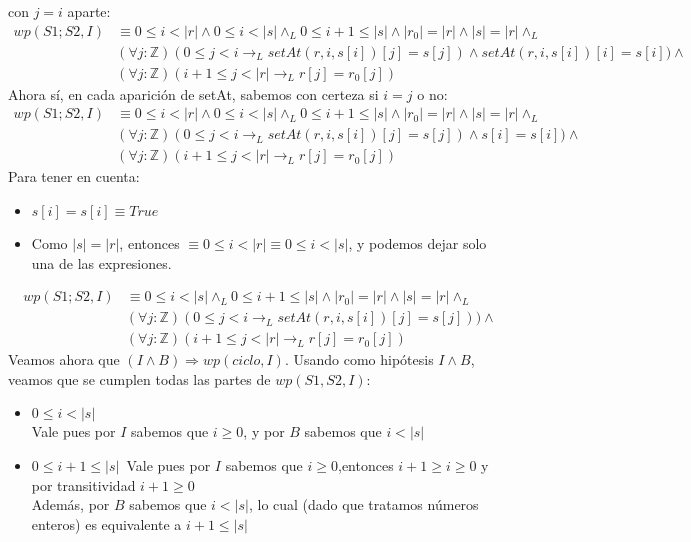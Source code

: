 \documentclass{article}
\begin{document}
\begin{enumerate}[label=\alph*)]
	con $j=i$ aparte:\\
	\begin{align*}
	wp(S1;S2,I)&\equiv   0\leq i<|r|\wedge 0\leq i<|s|\wedge_L 0\leq i+1\leq |s| \wedge |r_0|=|r|\wedge |s|=|r|\wedge_L \\
		&(\forall j:\mathbb{Z})(0\leq j<i \rightarrow_L setAt(r,i,s[i])[j]=s[j])\wedge setAt(r,i,s[i])[i]=s[i])\wedge\\
		&(\forall j:\mathbb{Z})(i+1\leq j<|r|\rightarrow_L r[j]=r_0[j])
	\end{align*}
	Ahora sí, en cada aparición de setAt, sabemos con certeza si $i=j$ o no:\\
	\begin{align*}
	wp(S1;S2,I)&\equiv   0\leq i<|r|\wedge 0\leq i<|s|\wedge_L 0\leq i+1\leq |s| \wedge |r_0|=|r|\wedge |s|=|r|\wedge_L \\
		&(\forall j:\mathbb{Z})(0\leq j<i \rightarrow_L setAt(r,i,s[i])[j]=s[j])\wedge s[i]=s[i])\wedge\\
		&(\forall j:\mathbb{Z})(i+1\leq j<|r|\rightarrow_L r[j]=r_0[j])
	\end{align*}
	Para tener en cuenta:\\
	\begin{itemize}
	\item $s[i]=s[i]\equiv True$
	\item Como $|s|=|r|$, entonces $\equiv 0\leq i<|r|\equiv 0\leq i<|s|$, y podemos dejar solo una de las expresiones.
	\end{itemize}
	\begin{align*}
	wp(S1;S2,I)&\equiv   0\leq i<|s|\wedge_L 0\leq i+1\leq |s| \wedge |r_0|=|r|\wedge |s|=|r|\wedge_L \\
		&(\forall j:\mathbb{Z})(0\leq j<i \rightarrow_L setAt(r,i,s[i])[j]=s[j]))\wedge\\
		&(\forall j:\mathbb{Z})(i+1\leq j<|r|\rightarrow_L r[j]=r_0[j])
	\end{align*}
	Veamos ahora que $(I\wedge B) \Rightarrow wp(ciclo,I)$. Usando como hipótesis $I\wedge B$, veamos que se cumplen todas 
	las partes de $wp(S1,S2,I)$:
	\begin{itemize}
	\item $0\leq i<|s|$\\
	Vale pues por $I$ sabemos que $i\geq 0$, y por $B$ sabemos que $i<|s|$
	\item $0\leq i+1\leq|s|$\
	Vale pues por $I$ sabemos que $i\geq 0$,entonces $i+1\geq i\geq 0$ y por transitividad $i+1\geq 0$\\
	Además, por $B$ sabemos que $i<|s|$, lo cual (dado que tratamos números enteros) es equivalente a $i+1\leq |s|$

\end{itemize}
\end{enumerate}
\end{document}
